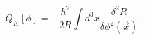 \begin{equation}
Q_{K}[\phi]=-\frac{\hbar^{2}}{2R}\int d^{3}x\frac{\delta^{2}R}{\delta\phi
^{2}\left(  \vec{x}\right)  }.\label{19.4}%
\end{equation}

